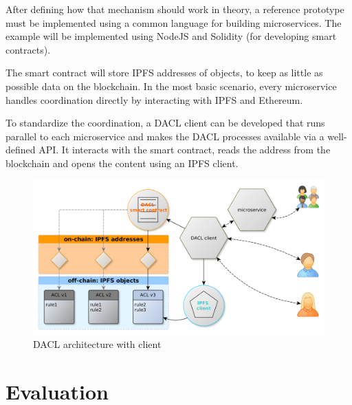 \documentclass[12pt, conference]{IEEEtran}
\begin{document}
After defining how that mechanism should work in theory, a reference prototype must be implemented using a common language for building microservices. The example will be implemented using NodeJS and Solidity (for developing smart contracts). 

The smart contract will store IPFS addresses of objects, to keep as little as possible data on the blockchain. In the most basic scenario, every microservice handles coordination directly by interacting with IPFS and Ethereum. 

To standardize the coordination, a DACL client can be developed that runs parallel to each microservice and makes the DACL processes available via a well-defined API. It interacts with the smart contract, reads the address from the blockchain and opens the content using an IPFS client.


\begin{figure}[!hb]
  \centering
  \includegraphics[width=\linewidth]{figures/eth-ipfs-design-with-client.png}
  \caption{DACL architecture with client}
  \label{fig:ipfs-design-with-client}
  \centering
\end{figure}




\section{Evaluation}
\end{document}
